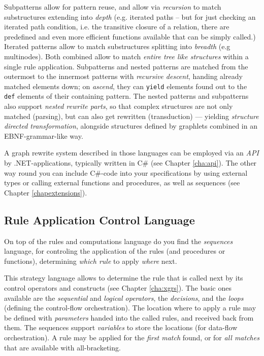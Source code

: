 Subpatterns allow for pattern reuse, and allow via \emph{recursion} to match substructures extending into \emph{depth} (e.g. iterated paths -- but for just checking an iterated path condition, i.e. the transitive closure of a relation, there are predefined and even more efficient functions available that can be simply called.)
Iterated patterns allow to match substructures splitting into \emph{breadth} (e.g multinodes).
Both combined allow to match \emph{entire tree like structures} within a single rule application. 
Subpatterns and nested patterns are matched from the outermost to the innermost patterns with \emph{recursive descent}, handing already matched elements down; on \emph{ascend}, they can \texttt{yield} elements found out to the \texttt{def} elements of their containing pattern.
The nested patterns and subpatterns also support \emph{nested rewrite parts}, so that complex structures are not only matched (parsing), but can also get rewritten (transduction) --- yielding \emph{structure directed transformation}, alongside structures defined by graphlets combined in an EBNF-grammar-like way\cite{EBNFAGTIVE}.

A graph rewrite system described in those languages can be employed via an \emph{API} by .NET-applications, typically written in C\# (see Chapter \ref{cha:api}).
The other way round you can include C\#-code into your specifications by using external types or calling external functions and procedures, as well as sequences (see Chapter \ref{chapextensions}).

\subsection{Rule Application Control Language}
On top of the rules and computations language do you find the \emph{sequences} language, for controling the application of the rules (and procedures or functions), determining \emph{which rule} to apply \emph{where} next. 

This strategy language allows to determine the rule that is called next by its control operators and constructs (see Chapter \ref{cha:xgrs}).
The basic ones available are the \emph{sequential} and \emph{logical operators}, the \emph{decisions}, and the \emph{loops} (defining the control-flow orchestration).
The location where to apply a rule may be defined with \emph{parameters} handed into the called rules, and received back from them. 
The sequences support \emph{variables} to store the locations (for data-flow orchestration).
A rule may be applied for the \emph{first match} found, or for \emph{all matches} that are available with all-bracketing.

